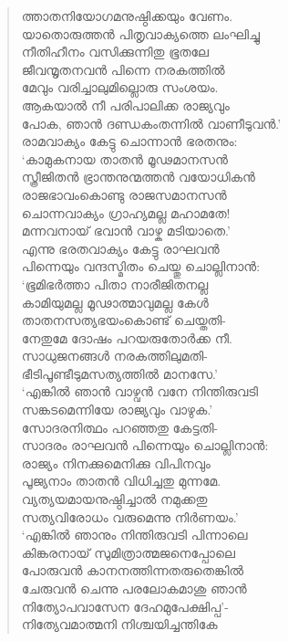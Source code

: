 \begin{verse}
ത്താതനിയോഗമനുഷ്ഠിക്കയും വേണം.\\
യാതൊരുത്തന്‍ പിതൃവാക്യത്തെ ലംഘിച്ചു\\
നീതിഹീനം വസിക്കുന്നിതു ഭൂതലേ\\
ജീവന്മൃതനവന്‍ പിന്നെ നരകത്തില്‍\\
മേവും വരിച്ചാലുമില്ലൊരു സംശയം.\\
ആകയാല്‍ നീ പരിപാലിക്ക രാജ്യവും\\
പോക, ഞാന്‍ ദണ്ഡകംതന്നില്‍ വാണീടുവന്‍.’\\
രാമവാക്യം കേട്ടു ചൊന്നാന്‍ ഭരതനും:\\
‘കാമുകനായ താതന്‍ മൂഢമാനസന്‍\\
സ്ത്രീജിതന്‍ ഭ്രാന്തനുന്മത്തന്‍ വയോധികന്‍\\
രാജഭാവംകൊണ്ടു രാജസമാനസന്‍\\
ചൊന്നവാക്യം ഗ്രാഹ്യമല്ല മഹാമതേ!\\
മന്നവനായ് ഭവാന്‍ വാഴ്ക മടിയാതെ.’\\
എന്നു ഭരതവാക്യം കേട്ടു രാഘവന്‍\\
പിന്നെയും വന്ദസ്മിതം ചെയ്തു ചൊല്ലിനാന്‍:\\
‘ഭൂമിഭര്‍ത്താ പിതാ നാരീജിതനല്ല\\
കാമിയുമല്ല മൂഢാത്മാവുമല്ല കേള്‍\\
താതനസത്യഭയംകൊണ്ട് ചെയ്തതി-\\
നേതുമേ ദോഷം പറയരുതോര്‍ക്ക നീ.\\
സാധുജനങ്ങള്‍ നരകത്തിലുമതി-\\
ഭീടിപൂണ്ടീടുമസത്യത്തില്‍ മാനസേ.’\\
‘എങ്കില്‍ ഞാന്‍ വാഴ്വന്‍ വനേ നിന്തിരുവടി\\
സങ്കടമെന്നിയേ രാജ്യവും വാഴുക.’\\
സോദരനിത്ഥം പറഞ്ഞതു കേട്ടതി-\\
സാദരം രാഘവന്‍ പിന്നെയും ചൊല്ലിനാന്‍:\\
രാജ്യം നിനക്കുമെനിക്കു വിപിനവും\\
പൂജ്യനാം താതന്‍ വിധിച്ചതു മുന്നമേ.\\
വ്യത്യയമായനുഷ്ഠിച്ചാല്‍ നമുക്കതു\\
സത്യവിരോധം വരുമെന്നു നിര്‍ണയം.’\\
‘എങ്കില്‍ ഞാനും നിന്തിരുവടി പിന്നാലെ\\
കിങ്കരനായ് സുമിത്രാത്മജനെപ്പോലെ\\
പോരുവന്‍ കാനനത്തിന്നതരുതെങ്കില്‍\\
ചേരുവന്‍ ചെന്നു പരലോകമാശു ഞാന്‍\\
നിത്യോപവാസേന ദേഹമുപേക്ഷിപ്പ’-\\
നിത്യേവമാത്മനി നിശ്ചയിച്ചന്തികേ\\

\end{verse}
